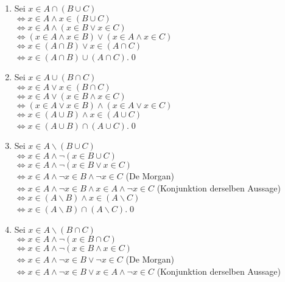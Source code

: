 \begin{loesung}
    \begin{enumerate}
        \item Sei $x\in A\cap (B\cup C)$\\
        $\Leftrightarrow x\in A\wedge x\in (B\cup C)$\\
        $\Leftrightarrow x\in A\wedge (x\in B\vee x\in C)$\\
        $\Leftrightarrow (x\in A\wedge x\in B)\vee (x\in A\wedge x\in C)$\\
        $\Leftrightarrow x\in (A\cap B)\vee x\in (A\cap C)$\\
        $\Leftrightarrow x\in (A\cap B)\cup (A\cap C)$.\qed
        \item Sei $x\in A\cup (B\cap C)$\\
        $\Leftrightarrow x\in A\vee x\in (B\cap C)$\\
        $\Leftrightarrow x\in A\vee (x\in B\wedge x\in C)$\\
        $\Leftrightarrow (x\in A\vee x\in B)\wedge (x\in A\vee x\in C)$\\
        $\Leftrightarrow x\in (A\cup B)\wedge x\in (A\cup C)$\\
        $\Leftrightarrow x\in (A\cup B)\cap (A\cup C)$.\qed
        \item Sei $x\in A\backslash (B\cup C)$\\
        $\Leftrightarrow x\in A\wedge \neg (x\in B\cup C)$\\
        $\Leftrightarrow x\in A\wedge \neg (x\in B\vee x\in C)$\\
        $\Leftrightarrow x\in A\wedge \neg x\in B\wedge \neg x\in C$ (De Morgan)\\
        $\Leftrightarrow x\in A\wedge \neg x\in B\wedge x\in A\wedge \neg x\in C$ (Konjunktion derselben Aussage)\\
        $\Leftrightarrow x\in (A\backslash B)\wedge x\in (A\backslash C)$\\
        $\Leftrightarrow x\in (A\backslash B)\cap (A\backslash C)$.\qed
        \item Sei $x\in A\backslash (B\cap C)$\\
        $\Leftrightarrow x\in A\wedge \neg (x\in B\cap C)$\\
        $\Leftrightarrow x\in A\wedge \neg (x\in B\wedge x\in C)$\\
        $\Leftrightarrow x\in A\wedge \neg x\in B\vee \neg x\in C$ (De Morgan)\\
        $\Leftrightarrow x\in A\wedge \neg x\in B\vee x\in A\wedge \neg x\in C$ (Konjunktion derselben Aussage)\\

\end{enumerate}
\end{loesung}
